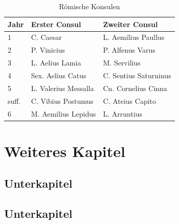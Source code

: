 \begin{table}[htb]
	\begin{center}
		\begin{tabular}{|l|l|l|}
			\hline
			Jahr  & Erster Consul        & Zweiter Consul        \\
			\hline \hline
			1     & C. Caesar            & L. Aemilius Paullus   \\
			2     & P. Vinicius          & P. Alfenus Varus      \\
			3     & L. Aelius Lamia      & M. Servilius          \\
			4     & Sex. Aelius Catus    & C. Sentius Saturninus \\
			5     & L. Valerius Messalla & Cn. Cornelius Cinna   \\
			suff. & C. Vibius Postumus   & C. Ateius Capito      \\
			6     & M. Aemilius Lepidus  & L. Arruntius          \\
			\hline
		\end{tabular}
		\caption{Römische Konsulen}\label{tab_Konsulen}
	\end{center}
\end{table}


\pagebreak




\pagebreak
\section{Weiteres Kapitel}\raggedbottom
\subsection{Unterkapitel}
\subsection{Unterkapitel}